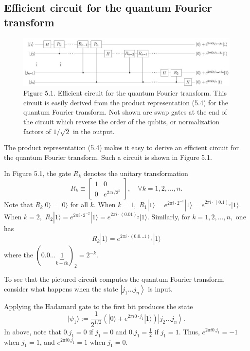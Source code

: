 \subsection{Efficient circuit for the quantum Fourier transform}

\begin{figure}     
\centering
\includegraphics[width=1\linewidth]{Images/2024_05_17_6977ce60de6fd27aef98g-253}
\caption{Figure 5.1. Efficient circuit for the quantum Fourier transform. This circuit is easily derived from the product representation (5.4) for the quantum Fourier transform. Not shown are swap gates at the end of the circuit which reverse the order of the qubits, or normalization factors of $1 / \sqrt{2}$ in the output.}
\end{figure}

The product representation (5.4) makes it easy to derive an efficient circuit for the quantum Fourier transform. Such a circuit is shown in Figure 5.1. 

In Figure 5.1, the gate $R_{k}$ denotes the unitary transformation
\begin{equation*}
R_{k} \equiv\left[\begin{array}{cc}
1 & 0  \tag{5.11}\\
0 & e^{2 \pi i / 2^{k}}
\end{array}\right], \quad \forall k = 1,2,\dots,n.
\end{equation*}
Note that $R_{k} |0\rangle = |0\rangle$ for all $k.$ When $k=1,$ $R_{1} |1\rangle = e^{2 \pi i\cdot 2^{-1}}|1\rangle = e^{2 \pi i\cdot (0.1)_2}|1\rangle$. When $k=2,$ $R_{2} |1\rangle = e^{2 \pi i\cdot 2^{-2}}|1\rangle = e^{2 \pi i\cdot (0.01)_2}|1\rangle.$ Similarly, for $k=1,2,\dots,n,$ one has
$$
R_{k} |1\rangle = e^{2 \pi i\cdot (0.0 \dots 1)_2}|1\rangle
$$
where the $(0.0 \dots \underbrace{1}_{k-th})_2=2^{-k}.$

To see that the pictured circuit computes the quantum Fourier transform, consider what happens when the state $\left|j_{1} \ldots j_{n}\right\rangle$ is input. 

Applying the Hadamard gate to the first bit produces the state
\begin{equation*}
|\psi_1\rangle:=\frac{1}{2^{1 / 2}}\left(|0\rangle+e^{2 \pi i 0 \cdot j_{1}}|1\rangle\right)\left|j_{2} \ldots j_{n}\right\rangle. \tag{5.12}
\end{equation*}
In above, note that $0.j_1=0$ if $j_1=0$ and $0.j_1=\frac{1}{2}$ if $j_1=1.$ Thus, $e^{2 \pi i 0 . j_{1}}=-1$ when $j_{1}=1$, and $e^{2 \pi i 0 . j_{1}}=1$  when $j_{1}=0.$

